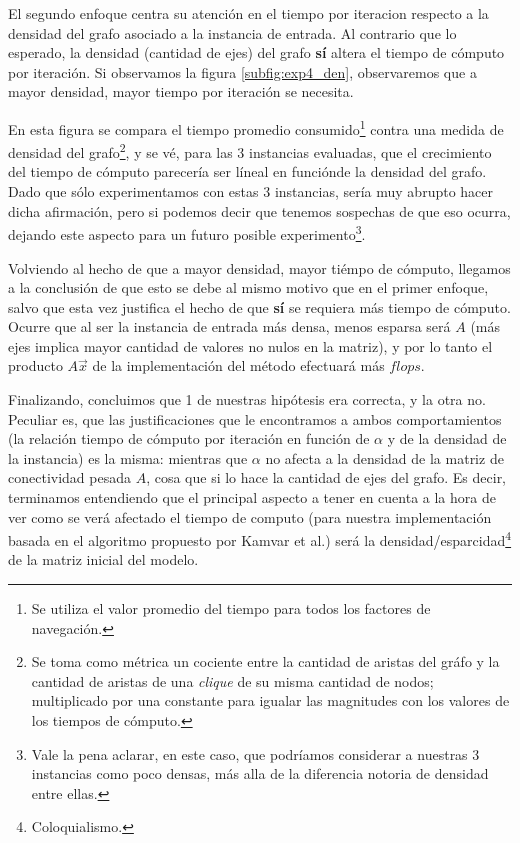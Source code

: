 \par El segundo enfoque centra su atención en el tiempo por
iteracion respecto a la densidad del grafo asociado a la instancia de entrada.
Al contrario que lo esperado, la densidad (cantidad de ejes) del
grafo \textbf{s\'i} altera el tiempo de cómputo por iteración. Si observamos la
figura \ref{subfig:exp4_den}, observaremos que a mayor densidad, mayor tiempo
por iteraci\'on se necesita.

\par En esta figura se compara el tiempo promedio consumido\footnote{Se utiliza
el valor promedio del tiempo para todos los factores de navegación.} contra una
medida de densidad del grafo\footnote{Se toma como métrica un cociente entre la
cantidad de aristas del gráfo y la cantidad de aristas de una \emph{clique} de
su misma cantidad de nodos; multiplicado por una constante para igualar las
magnitudes con los valores de los tiempos de c\'omputo.}, y se v\'e, para las 3
instancias evaluadas, que el crecimiento del tiempo de c\'omputo parecer\'ia ser
l\'ineal en funci\'onde la densidad del grafo. Dado que s\'olo experimentamos
con estas 3 instancias, ser\'ia muy abrupto hacer dicha afirmaci\'on, pero si
podemos decir que tenemos sospechas de que eso ocurra, dejando este aspecto para
un futuro posible experimento\footnote{Vale la pena aclarar, en este caso, que
podr\'iamos considerar a nuestras 3 instancias como poco densas, m\'as alla de
la diferencia notoria de densidad entre ellas.}.

\par Volviendo al hecho de que a mayor densidad, mayor ti\'empo de c\'omputo,
llegamos a la conclusi\'on de que esto se debe al mismo motivo que en el primer
enfoque, salvo que esta vez justifica el hecho de que \textbf{s\'i} se requiera
m\'as tiempo de c\'omputo. Ocurre que al ser la instancia de entrada m\'as
densa, menos esparsa ser\'a $A$ (m\'as ejes implica mayor cantidad de valores no
nulos en la matriz), y por lo tanto el producto $A\vec{x}$ de la
implementaci\'on del m\'etodo efectuar\'a m\'as $flops$.

\medskip
\par Finalizando, concluimos que 1 de nuestras hip\'otesis era correcta, y la
otra no. Peculiar es, que las justificaciones que le encontramos a ambos
comportamientos (la relaci\'on tiempo de c\'omputo por iteraci\'on en funci\'on
de $\alpha$ y de la densidad de la instancia) es la misma: mientras que $\alpha$
no afecta a la densidad de la matriz de conectividad pesada $A$, cosa que si lo
hace la cantidad de ejes del grafo. Es decir, terminamos entendiendo que el
principal aspecto a tener en cuenta a la hora de ver como se ver\'a afectado el
tiempo de computo (para nuestra implementaci\'on basada en el algoritmo
propuesto por Kamvar et al.\cite{Kamvar2003}) ser\'a la
densidad/esparcidad\footnote{Coloquialismo.} de la matriz inicial del modelo.
